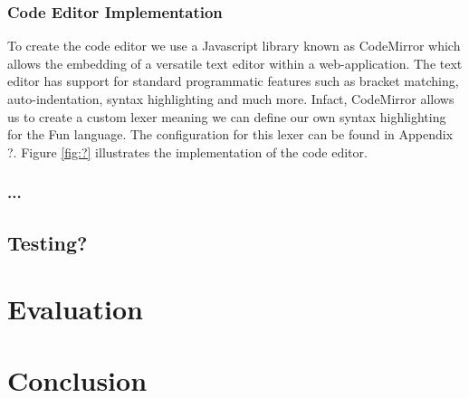 \documentclass{l4proj}
\begin{document}
\subsection{Code Editor Implementation}
To create the code editor we use a Javascript library known as CodeMirror which allows the embedding of a versatile text editor within a web-application. The text editor has support for standard programmatic features such as bracket matching, auto-indentation, syntax highlighting and much more. Infact, CodeMirror allows us to create a custom lexer meaning we can define our own syntax highlighting for the Fun language. The configuration for this lexer can be found in Appendix ?. Figure \ref{fig:?} illustrates the implementation of the code editor.

\subsection{}
\subsection{...}
\section{Testing?}

\chapter{Evaluation}
\chapter{Conclusion}
  

\end{document}
